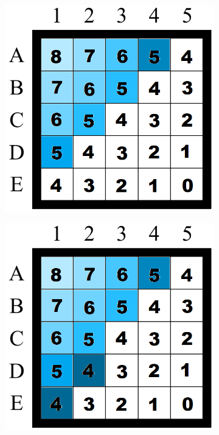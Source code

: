 \begin{figure}[H]
\begin{subfigure}[b]{.3\textwidth}
\end{subfigure}
\newline
\linebreak
\begin{subfigure}[b]{.3\textwidth}
  \centering
  \includegraphics[width=0.95\linewidth]{Report/Part2/g tie breaker/smaller g/7.png}  
\end{subfigure}
\begin{subfigure}[b]{.3\textwidth}
  \centering
  \includegraphics[width=0.95\linewidth]{Report/Part2/g tie breaker/smaller g/8.png}  

\end{subfigure}
\end{figure}

